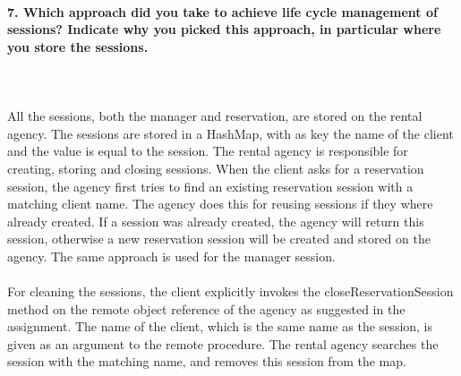 \documentclass{ds-report}
\begin{document}
	\paragraph{7. Which approach did you take to achieve life cycle management of sessions? Indicate why you picked this approach, in particular where you store the sessions.} \mbox{}\\\\
All the sessions, both the manager and reservation, are stored on the rental agency. The sessions are stored in a HashMap, with as key the name of the client and the value is equal to the session. The rental agency is responsible for creating, storing and closing sessions. When the client asks for a reservation session, the agency first tries to find an existing reservation session with a matching client name. The agency does this for reusing sessions if they where already created. If a session was already created, the agency will return this session, otherwise a new reservation session will be created and stored on the agency. The same approach is used for the manager session.\\\\
For cleaning the sessions, the client explicitly invokes the closeReservationSession method on the remote object reference of the agency as suggested in the assignment. The name of the client, which is the same name as the session, is given as an argument to the remote procedure. The rental agency searches the session with the matching name, and removes this session from the map.

\clearpage
\end{document}
